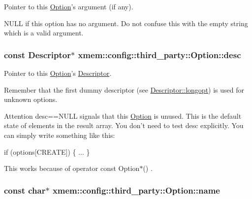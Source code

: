 Pointer to this \hyperlink{classxmem_1_1config_1_1third__party_1_1_option}{Option}'s argument (if any). 

N\-U\-L\-L if this option has no argument. Do not confuse this with the empty string which is a valid argument. \hypertarget{classxmem_1_1config_1_1third__party_1_1_option_a561317d9c847dee40c9da4a1c2065d8a}{
\subsubsection[{desc}]{\setlength{\rightskip}{0pt plus 5cm}const {\bf Descriptor}$\ast$ xmem\-::config\-::third\-\_\-party\-::\-Option\-::desc}}\label{classxmem_1_1config_1_1third__party_1_1_option_a561317d9c847dee40c9da4a1c2065d8a}


Pointer to this \hyperlink{classxmem_1_1config_1_1third__party_1_1_option}{Option}'s \hyperlink{structxmem_1_1config_1_1third__party_1_1_descriptor}{Descriptor}. 

Remember that the first dummy descriptor (see \hyperlink{structxmem_1_1config_1_1third__party_1_1_descriptor_a7246a4bfc669f68bb406dece398be7bb}{Descriptor\-::longopt}) is used for unknown options.

\begin{DoxyAttention}{Attention}
{\ttfamily desc==N\-U\-L\-L} signals that this \hyperlink{classxmem_1_1config_1_1third__party_1_1_option}{Option} is unused. This is the default state of elements in the result array. You don't need to test {\ttfamily desc} explicitly. You can simply write something like this\-: 
\begin{DoxyCode}
\textcolor{keywordflow}{if} (options[CREATE])
\{
  ...
\}
\end{DoxyCode}
 This works because of {\ttfamily  operator const Option$\ast$() }. 
\end{DoxyAttention}
\hypertarget{classxmem_1_1config_1_1third__party_1_1_option_aa73b73027c0a9140aeec654f3fe9aef6}{
\subsubsection[{name}]{\setlength{\rightskip}{0pt plus 5cm}const char$\ast$ xmem\-::config\-::third\-\_\-party\-::\-Option\-::name}}\label{classxmem_1_1config_1_1third__party_1_1_option_aa73b73027c0a9140aeec654f3fe9aef6}


